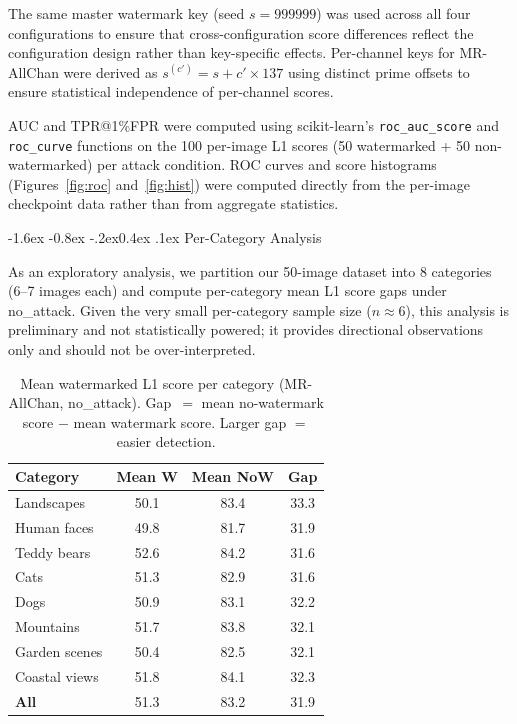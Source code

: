 \documentclass[10pt,twocolumn]{article}
\makeatletter
\renewcommand\subsection{\@startsection{subsection}{2}{\z@}%
  {-1.6ex \@plus -0.8ex \@minus -.2ex}{0.4ex \@plus .1ex}%
  {\normalfont\normalsize\itshape}}
\makeatother
\begin{document}
The same master watermark key (seed $s{=}999999$) was used across all
four configurations to ensure that cross-configuration score differences
reflect the configuration design rather than key-specific effects.
Per-channel keys for MR-AllChan were derived as $s^{(c')} = s + c' \times 137$
using distinct prime offsets to ensure statistical independence of
per-channel scores.

AUC and TPR@1\%FPR were computed using scikit-learn's
\texttt{roc\_auc\_score} and \texttt{roc\_curve} functions on the
100 per-image L1 scores (50 watermarked + 50 non-watermarked)
per attack condition.
ROC curves and score histograms (Figures~\ref{fig:roc} and~\ref{fig:hist})
were computed directly from the per-image checkpoint data rather than
from aggregate statistics.

\subsection{Per-Category Analysis}
\label{sec:category}

As an exploratory analysis, we partition our 50-image dataset into
8 categories (6--7 images each) and compute per-category mean L1
score gaps under no\_attack.
Given the very small per-category sample size ($n \approx 6$),
this analysis is preliminary and not statistically powered;
it provides directional observations only and should not be
over-interpreted.

\begin{table}[htbp]
  \centering
  \caption{Mean watermarked L1 score per category (MR-AllChan, no\_attack).
    Gap~$=$ mean no-watermark score $-$ mean watermark score.
    Larger gap $=$ easier detection.}
  \label{tab:category}
  \setlength{\tabcolsep}{3pt}
  \small
  \begin{tabular}{lccc}
    \toprule
    \textbf{Category} & \textbf{Mean W} & \textbf{Mean NoW} & \textbf{Gap} \\
    \midrule
    Landscapes        & 50.1 & 83.4 & 33.3 \\
    Human faces       & 49.8 & 81.7 & 31.9 \\
    Teddy bears       & 52.6 & 84.2 & 31.6 \\
    Cats              & 51.3 & 82.9 & 31.6 \\
    Dogs              & 50.9 & 83.1 & 32.2 \\
    Mountains         & 51.7 & 83.8 & 32.1 \\
    Garden scenes     & 50.4 & 82.5 & 32.1 \\
    Coastal views     & 51.8 & 84.1 & 32.3 \\
    \midrule
    \textbf{All}      & 51.3 & 83.2 & 31.9 \\
    \bottomrule
  \end{tabular}
\end{table}
\end{document}
